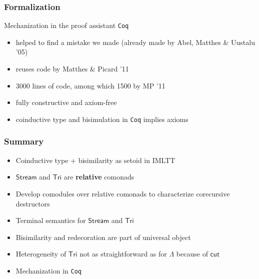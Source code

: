 \documentclass[
]
{beamer}
\newcommand{\constfont}[1]{\ensuremath{\mathsf{#1}}}
\newcommand{\Tri}{\constfont{Tri}}
\newcommand{\stream}{\constfont{Stream}}
\newcommand{\redec}{\constfont{redec}}
\newcommand{\cut}{\constfont{cut}}
\newcommand{\Setoid}{\constfont{Setoid}}
\newcommand{\LC}{{\Lambda}}
\newcommand{\fat}[1]{\textbf{#1}}
\begin{document}

\begin{comment}
\begin{frame}
 \frametitle{Closing remarks}
 
   \begin{block}{Higher order compatibility}
    Observing that $\Setoid$ is cartesian closed, one can encode
       \[ f \sim g  \Longrightarrow \redec~f \sim \redec~g\]
    in definition of coalgebra for signature of $\Tri$
   \end{block}
\end{frame}
\end{comment}
 
\begin{frame}
  \frametitle{Formalization}
   \begin{block}{Mechanization in the proof assistant \texttt{Coq}}
      \begin{itemize}\setlength{\itemsep}{1em}
       \item helped to find a mistake we made (already made by Abel, Matthes \& Uustalu '05)
       \item reuses code by Matthes \& Picard '11
       \item 3000 lines of code, among which 1500 by MP '11
       \item fully constructive and axiom-free
       \item coinductive type and bisimulation in \texttt{Coq} implies axioms
      \end{itemize}
   \end{block}
   
\end{frame}

\begin{frame}
 \frametitle{Summary}
  
   \begin{itemize}\setlength{\itemsep}{1em}
    \item Coinductive type + bisimilarity as setoid in IMLTT
    \item $\stream$ and $\Tri$ are \fat{relative} comonads
    \item Develop comodules over relative comonads to characterize corecursive destructors
    \item Terminal semantics for $\stream$ and $\Tri$
    \item Bisimilarity and redecoration are part of universal object
    \item Heterogeneity of $\Tri$ not as straightforward as for $\LC$ because of $\cut$
    \item Mechanization in \texttt{Coq}
   \end{itemize}

   
\end{frame}
\end{document}
